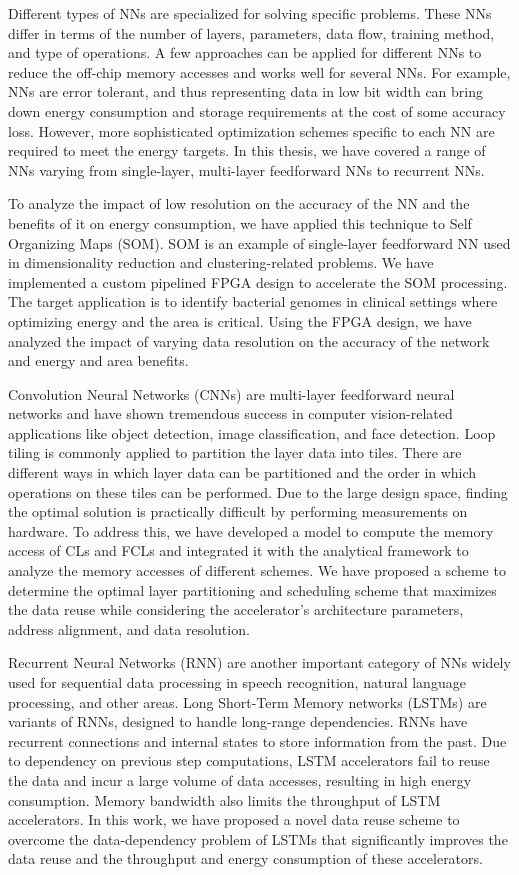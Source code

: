 Different types of NNs are specialized for solving specific problems. These NNs differ in terms of the number of layers, parameters, data flow, training method, and type of operations. A few approaches can be applied for different NNs to reduce the off-chip memory accesses and works well for several NNs. For example, NNs are error tolerant, and thus representing data in low bit width can bring down energy consumption and storage requirements at the cost of some accuracy loss. However, more sophisticated optimization schemes specific to each NN are required to meet the energy targets. In this thesis, we have covered a range of NNs varying from single-layer, multi-layer feedforward NNs to recurrent NNs. 

To analyze the impact of low resolution on the accuracy of the NN and the benefits of it on energy consumption, we have applied this technique to Self Organizing Maps (SOM). SOM is an example of single-layer feedforward NN used in dimensionality reduction and clustering-related problems. We have implemented a custom pipelined FPGA design to accelerate the SOM processing. The target application is to identify bacterial genomes in clinical settings where optimizing energy and the area is critical. Using the FPGA design, we have analyzed the impact of varying data resolution on the accuracy of the network and energy and area benefits.

Convolution Neural Networks (CNNs) are multi-layer feedforward neural networks and have shown tremendous success in computer vision-related applications like object detection, image classification, and face detection. Loop tiling is commonly applied to partition the layer data into tiles. There are different ways in which layer data can be partitioned and the order in which operations on these tiles can be performed. Due to the large design space, finding the optimal solution is practically difficult by performing measurements on hardware. To address this, we have developed a model to compute the memory access of CLs and FCLs and integrated it with the analytical framework to analyze the memory accesses of different schemes. We have proposed a scheme to determine the optimal layer partitioning and scheduling scheme that maximizes the data reuse while considering the accelerator's architecture parameters, address alignment, and data resolution.

Recurrent Neural Networks (RNN) are another important category of NNs widely used for sequential data processing in speech recognition, natural language processing, and other areas. Long Short-Term Memory networks (LSTMs) are variants of RNNs, designed to handle long-range dependencies. RNNs have recurrent connections and internal states to store information from the past. Due to dependency on previous step computations, LSTM accelerators fail to reuse the data and incur a large volume of data accesses, resulting in high energy consumption. Memory bandwidth also limits the throughput of LSTM accelerators. In this work, we have proposed a novel data reuse scheme to overcome the data-dependency problem of LSTMs that significantly improves the data reuse and the throughput and energy consumption of these accelerators.


